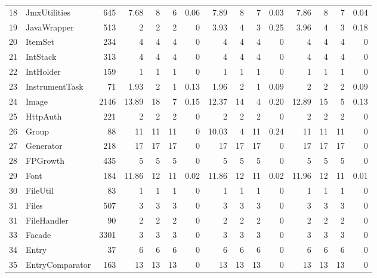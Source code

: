 \documentclass{acm_proc_article-sp}
\begin{document}
\begin{table} [htp!]
{\begin{tabularx}{1.2 \textwidth}{r l r r r r r r r r r r r r r}
 18						& JmxUtilities					&645	& 7.68&	8	&	6	& 		0.06					& 7.89	& 8 		& 7		& 		0.03			& 7.86		& 8			& 7			&	0.04\\      
 19						& JavaWrapper					&513	& 2	&	2	&	2	& 		0					& 3.93	& 4 		& 3		& 		0.25			& 3.96		& 4			& 3			&	0.18\\      
 20						& ItemSet						&234	& 4	&	4	&	4	& 		0					& 4		& 4 		& 4		& 		0			& 4			& 4			& 4			&	0	\\      
 21						& IntStack						&313	& 4	&	4	&	4	& 		0					& 4		& 4 		& 4		& 		0			& 4			& 4			& 4			&	0	\\      
 22						& IntHolder					&159	& 1	&	1	&	1	& 		0					& 1		& 1 		& 1		& 		0			& 1			& 1			& 1			&	0	\\      
 23						& InstrumentTask				&71	& 1.93&	2	&	1	& 		0.13					& 1.96	& 2 		& 1		& 		0.09			& 2			& 2			& 2			&	0.09\\      
 24						& Image						&2146	& 13.89&	18	&	7	& 		0.15					& 12.37	& 14 		& 4		& 		0.20			& 12.89		& 15			& 5			&	0.13\\      
 25						& HttpAuth					&221	& 2	&	2	&	2	& 		0					& 2		& 2 		& 2		& 		0			& 2			& 2			& 2			&	0	\\      
 26						& Group						&88	& 11	&	11	&	11	& 		0					& 10.03	& 4 		& 11		& 		0.24			& 11			& 11			& 11			&	0	\\      
 27						& Generator					&218	& 17	&	17	&	17	& 		0					& 17		& 17 		& 17		& 		0			& 17			& 17			& 17			&	0	\\      
 28						& FPGrowth					&435	& 5	&	5	&	5	& 		0					& 5		&  5		& 5		& 		0			& 5			& 5			& 5			&	0	\\      
 29						& Font						&184	& 11.86&	12	&	11	& 		0.02					& 11.86	& 12 		& 11		& 		0.02			& 11.96		& 12			& 11			&	0.01\\      
 30						& FileUtil						&83	& 1	&	1	&	1	& 		0					& 1		& 1 		& 1		& 		0			& 1			& 1			& 1			&	0\\      
 31						& Files						&507	& 3	&	3	&	3	& 		0					& 3		& 3 		& 3		& 		0			& 3			& 3			& 3			&	0\\      
 31						& FileHandler					&90	& 2	&	2	&	2	& 		0					& 2		& 2 		& 2		& 		0			& 2			& 2			& 2			&	0\\      
 33						& Facade						&3301	& 3	&	3	&	3	& 		0					& 3		& 3 		& 3		& 		0			& 3			& 3			& 3			&	0\\      
 34						& Entry						&37	& 6	&	6	&	6	& 		0					& 6		& 6 		& 6		& 		0			& 6			& 6			& 6			&	0\\      
 35						& EntryComparator				&163	& 13	&	13	&	13	& 		0					& 13		& 13 		& 13		& 		0			& 13			& 13			& 13			&	0\\      

\end{tabularx}}
\end{table}
\end{document}

